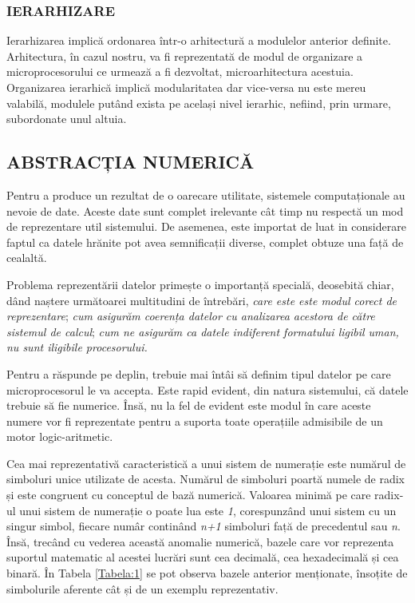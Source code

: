 \documentclass[12pt]{article}
\begin{document}
\subsubsection{IERARHIZARE}
Ierarhizarea implică ordonarea într-o arhitectură a modulelor anterior definite. Arhitectura, în cazul nostru, va fi reprezentată de modul de organizare a microprocesorului ce urmează a fi dezvoltat, microarhitectura acestuia. Organizarea ierarhică implică modularitatea dar vice-versa nu este mereu valabilă, modulele putând exista pe același nivel ierarhic, nefiind, prin urmare, subordonate unul altuia.

\subsection{ABSTRACȚIA NUMERICĂ}
Pentru a produce un rezultat de o oarecare utilitate, sistemele computaționale au nevoie de date. Aceste date sunt complet irelevante cât timp nu respectă un mod de reprezentare util sistemului. De asemenea, este importat de luat in considerare faptul ca datele hrănite pot avea semnificații diverse, complet obtuze una față de cealaltă.


Problema reprezentării datelor primește o importanță specială, deosebită chiar, dând naștere următoarei multitudini de întrebări, \textit{care este este modul corect de reprezentare}; \textit{cum asigurăm coerența datelor cu analizarea acestora de către sistemul de calcul}; \textit{cum ne asigurăm ca datele indiferent formatului ligibil uman, nu sunt iligibile procesorului.}


Pentru a răspunde pe deplin, trebuie mai întâi să definim tipul datelor pe care microprocesorul le va accepta. Este rapid evident, din natura sistemului, că datele trebuie să fie numerice. Însă, nu la fel de evident este modul în care aceste numere vor fi reprezentate pentru a suporta toate operațiile admisibile de un motor logic-aritmetic.

Cea mai reprezentativă caracteristică a unui sistem de numerație este numărul de simboluri unice utilizate de acesta. Numărul de simboluri poartă numele de radix și este congruent cu conceptul de bază numerică. Valoarea minimă pe care radix-ul unui sistem de numerație o poate lua este \textit{1}, corespunzând unui sistem cu un singur simbol, fiecare numâr continând \textit{n+1} simboluri față de precedentul sau \textit{n}. Însă, trecând cu vederea această anomalie numerică, bazele care vor reprezenta suportul matematic al acestei lucrări sunt cea decimală, cea hexadecimală și cea binară. În Tabela \ref{Tabela:1} se pot observa bazele anterior menționate, însoțite de simbolurile aferente cât și de un exemplu reprezentativ.
\end{document}
